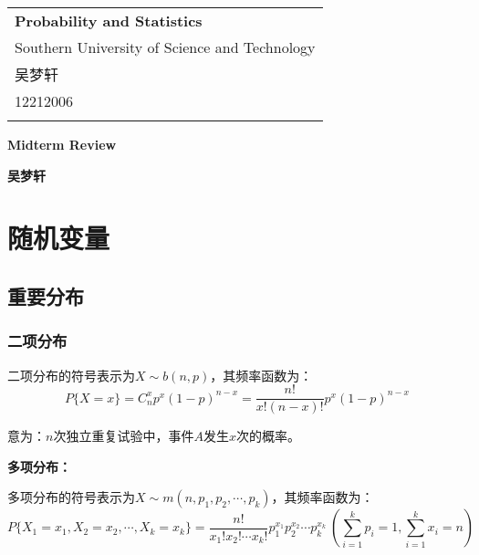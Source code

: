 \documentclass[a4paper,12pt]{ctexart}
\begin{document}
\thispagestyle{empty} %

\begin{tabular}{p{15.5cm}}
{\large \bf Probability and Statistics} \\
Southern University of Science and Technology \\ 吴梦轩 \\ 12212006 \\
\hline
\\
\end{tabular}

\vspace*{0.3cm} %

\begin{center}
	{\Large \bf Midterm Review}
	\vspace{2mm}

	{\bf 吴梦轩}
		
\end{center}  

\vspace{0.4cm}

\section{随机变量}

\subsection{重要分布}

\subsubsection{二项分布}

二项分布的符号表示为$X\sim b(n,p)$，其频率函数为：
\begin{equation*}
	P\{X = x\} = C_n^xp^x(1-p)^{n-x} = \frac{n!}{x!(n-x)!}p^x(1-p)^{n-x}
\end{equation*}

意为：$n$次独立重复试验中，事件$A$发生$x$次的概率。

\textbf{多项分布：}

多项分布的符号表示为$X\sim m(n,p_1,p_2,\cdots,p_k)$，其频率函数为：
\begin{equation*}
	P\{X_1 = x_1,X_2 = x_2,\cdots,X_k = x_k\} = \frac{n!}{x_1!x_2!\cdots x_k!}p_1^{x_1}p_2^{x_2}\cdots p_k^{x_k}\ \left(\sum_{i=1}^kp_i = 1, \sum_{i=1}^kx_i = n\right)
\end{equation*}
\end{document}
